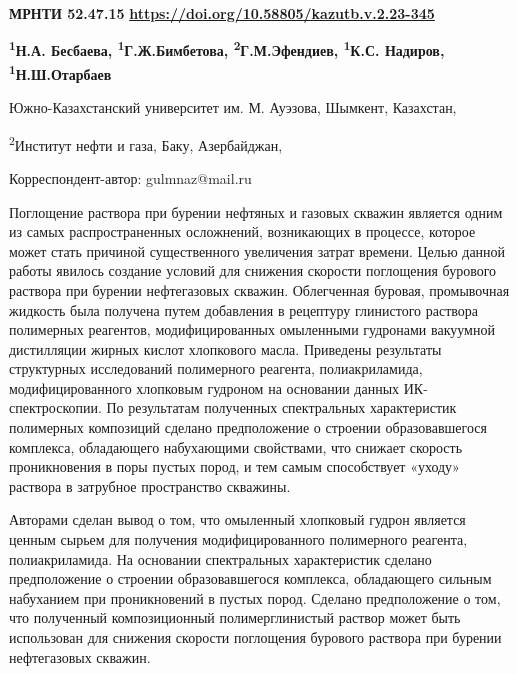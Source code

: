 \newpage
{\bfseries МРНТИ 52.47.15}
\hfill {\bfseries \href{https://doi.org/10.58805/kazutb.v.2.23-345}{https://doi.org/10.58805/kazutb.v.2.23-345}}


\begin{center}
{\bfseries \textsuperscript{1}Н.А. Бесбаева, \textsuperscript{1}Г.Ж.Бимбетова\envelope, \textsuperscript{2}Г.М.Эфендиев, \textsuperscript{1}К.С. Надиров, \textsuperscript{1}Н.Ш.Отарбаев}

Южно-Казахстанский университет им. М. Ауэзова, Шымкент, Казахстан,

\textsuperscript{2}Институт нефти и газа, Баку, Азербайджан,

\envelope Корреспондент-автор: gulmnaz@mail.ru
\end{center}

Поглощение раствора при бурении нефтяных и газовых скважин является
одним из самых распространенных осложнений, возникающих в процессе,
которое может стать причиной существенного увеличения затрат времени.
Целью данной работы явилось создание условий для снижения скорости
поглощения бурового раствора при бурении нефтегазовых скважин.
Облегченная буровая, промывочная жидкость была получена путем добавления
в рецептуру глинистого раствора полимерных реагентов, модифицированных
омыленными гудронами вакуумной дистилляции жирных кислот хлопкового
масла. Приведены результаты структурных исследований полимерного
реагента, полиакриламида, модифицированного хлопковым гудроном на
основании данных ИК-спектроскопии. По результатам полученных
спектральных характеристик полимерных композиций сделано предположение о
строении образовавшегося комплекса, обладающего набухающими свойствами,
что снижает скорость проникновения в поры пустых пород, и тем самым
способствует «уходу» раствора в затрубное пространство скважины.

Авторами сделан вывод о том, что омыленный хлопковый гудрон является
ценным сырьем для получения модифицированного полимерного реагента,
полиакриламида. На основании спектральных характеристик сделано
предположение о строении образовавшегося комплекса, обладающего сильным
набуханием при проникновений в пустых пород. Сделано предположение о
том, что полученный композиционный полимерглинистый раствор может быть
использован для снижения скорости поглощения бурового раствора при
бурении нефтегазовых скважин.

